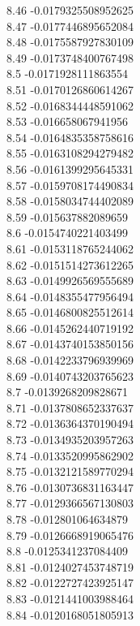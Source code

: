 {8.46	-0.0179325508952625\\
8.47	-0.0177446895652084\\
8.48	-0.0175587927830109\\
8.49	-0.0173748400767498\\
8.5	-0.0171928111863554\\
8.51	-0.0170126860614267\\
8.52	-0.0168344448591062\\
8.53	-0.016658067941956\\
8.54	-0.0164835358758616\\
8.55	-0.0163108294279482\\
8.56	-0.0161399295645331\\
8.57	-0.0159708174490834\\
8.58	-0.0158034744402089\\
8.59	-0.015637882089659\\
8.6	-0.0154740221403499\\
8.61	-0.0153118765244062\\
8.62	-0.0151514273612265\\
8.63	-0.0149926569555689\\
8.64	-0.0148355477956494\\
8.65	-0.0146800825512614\\
8.66	-0.0145262440719192\\
8.67	-0.0143740153850156\\
8.68	-0.0142233796939969\\
8.69	-0.0140743203765623\\
8.7	-0.0139268209828671\\
8.71	-0.0137808652337637\\
8.72	-0.0136364370190494\\
8.73	-0.0134935203957263\\
8.74	-0.0133520995862902\\
8.75	-0.0132121589770294\\
8.76	-0.0130736831163447\\
8.77	-0.0129366567130803\\
8.78	-0.012801064634879\\
8.79	-0.0126668919065476\\
8.8	-0.0125341237084409\\
8.81	-0.0124027453748719\\
8.82	-0.0122727423925147\\
8.83	-0.0121441003988464\\
8.84	-0.0120168051805913\\
}
